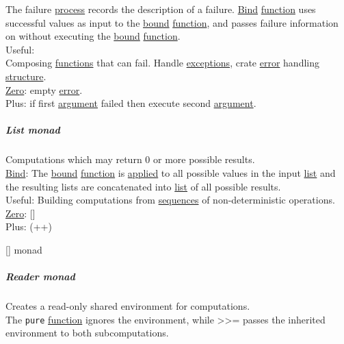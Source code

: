 \documentclass[a4paper,14pt,oneside]{book}
\begin{document}
The failure \hyperref[org24c34d9]{process} records the description of a failure. \hyperref[org624c8a5]{Bind} \hyperref[org25ee224]{function} uses successful values as input to the \hyperref[org616bef9]{bound} \hyperref[org25ee224]{function}, and passes failure information on without executing the \hyperref[org616bef9]{bound} \hyperref[org25ee224]{function}.\\

Useful:\\
Composing \hyperref[org0da3116]{functions} that can fail. Handle \hyperref[orgc7759f7]{exceptions}, crate \hyperref[org64de650]{error} handling \hyperref[org2f999c6]{structure}.\\

\hyperref[orgcad07b7]{Zero}: empty \hyperref[org64de650]{error}.\\
Plus: if first \hyperref[orgeeda40a]{argument} failed then execute second \hyperref[orgeeda40a]{argument}.\\

\subparagraph{\label{org75f46eb}List monad}
\label{sec:orgf3c6a4b}
Computations which may return 0 or more possible results.\\

\hyperref[org624c8a5]{Bind}: The \hyperref[org616bef9]{bound} \hyperref[org25ee224]{function} is \hyperref[org277c4f3]{applied} to all possible values in the input \hyperref[org6f6de24]{list} and the resulting lists are concatenated into \hyperref[org6f6de24]{list} of all possible results.\\

Useful: Building computations from \hyperref[org9896a5f]{sequences} of non-deterministic operations.\\

\hyperref[orgcad07b7]{Zero}: []\\
Plus: (++)\\

\subsubparagraph{\emph{*}}
\label{sec:orgba0f356}

\label{org166e332}[] monad\\

\subparagraph{\label{orgd16a797}Reader monad}
\label{sec:org423de04}
Creates a read-only shared environment for computations.\\

The \texttt{pure} \hyperref[org25ee224]{function} ignores the environment, while >>= passes the inherited environment to both subcomputations.\\
\end{document}
